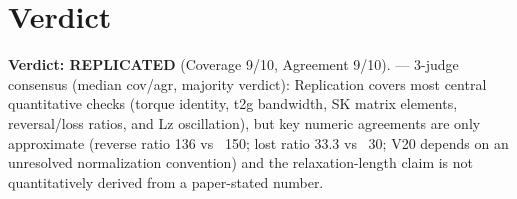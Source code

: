 \documentclass[11pt]{article}
\begin{document}
\section{Verdict}
\textbf{Verdict: REPLICATED} (Coverage 9/10, Agreement 9/10). — 3-judge consensus (median cov/agr, majority verdict): Replication covers most central quantitative checks (torque identity, t2g bandwidth, SK matrix elements, reversal/loss ratios, and Lz oscillation), but key numeric agreements are only approximate (reverse ratio 136 vs ~150; lost ratio 33.3 vs ~30; V20 depends on an unresolved normalization convention) and the relaxation-length claim is not quantitatively derived from a paper-stated number.
\end{document}
